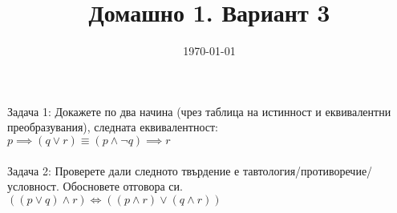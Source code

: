 \documentclass{article}
\begin{document}
     
\title{Домашно 1. Вариант 3}
\date{\today}
\maketitle
    
Задача 1: Докажете по два начина (чрез таблица на истинност и еквивалентни преобразувания), следната еквивалентност: \\

$ p \implies(q \lor r)  \equiv (p \land \lnot q) \implies r $ \\\\

Задача 2: Проверете дали следното твърдение е тавтология/противоречие/условност. Обосновете отговора си. \\

$ ((p \lor q) \land r) \iff ((p \land r) \lor (q \land r)) $
\end{document}
